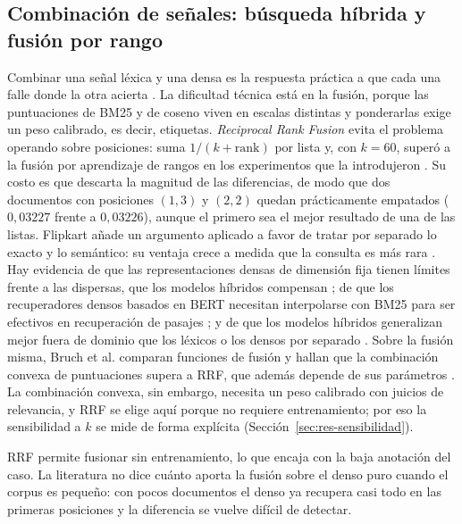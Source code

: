 \documentclass[11pt,letterpaper]{article}
\numberwithin{equation}{section}
\begin{document}
\subsection{Combinación de señales: búsqueda híbrida y fusión por rango}
\label{sec:ea-hibrida}
Combinar una señal léxica y una densa es la respuesta práctica a que cada una falle donde la otra acierta \cite{chen2024m3,zhao2022densesurvey}. La dificultad técnica está en la fusión, porque las puntuaciones de BM25 y de coseno viven en escalas distintas y ponderarlas exige un peso calibrado, es decir, etiquetas. \textit{Reciprocal Rank Fusion} evita el problema operando sobre posiciones: suma $1/(k+\text{rank})$ por lista y, con $k=60$, superó a la fusión por aprendizaje de rangos en los experimentos que la introdujeron \cite{cormack2009rrf}. Su costo es que descarta la magnitud de las diferencias, de modo que dos documentos con posiciones $(1,3)$ y $(2,2)$ quedan prácticamente empatados ($0{,}03227$ frente a $0{,}03226$), aunque el primero sea el mejor resultado de una de las listas. Flipkart añade un argumento aplicado a favor de tratar por separado lo exacto y lo semántico: su ventaja crece a medida que la consulta es más rara \cite{kothari2026flipkart}. Hay evidencia de que las representaciones densas de dimensión fija tienen límites frente a las dispersas, que los modelos híbridos compensan \cite{luan2021sparse}; de que los recuperadores densos basados en BERT necesitan interpolarse con BM25 para ser efectivos en recuperación de pasajes \cite{wang2021interpolation}; y de que los modelos híbridos generalizan mejor fuera de dominio que los léxicos o los densos por separado \cite{chen2022hybrid}. Sobre la fusión misma, Bruch et al. comparan funciones de fusión y hallan que la combinación convexa de puntuaciones supera a RRF, que además depende de sus parámetros \cite{bruch2024fusion}. La combinación convexa, sin embargo, necesita un peso calibrado con juicios de relevancia, y RRF se elige aquí porque no requiere entrenamiento; por eso la sensibilidad a $k$ se mide de forma explícita (Sección~\ref{sec:res-sensibilidad}).

RRF permite fusionar sin entrenamiento, lo que encaja con la baja anotación del caso. La literatura no dice cuánto aporta la fusión sobre el denso puro cuando el corpus es pequeño: con pocos documentos el denso ya recupera casi todo en las primeras posiciones y la diferencia se vuelve difícil de detectar.
\end{document}
